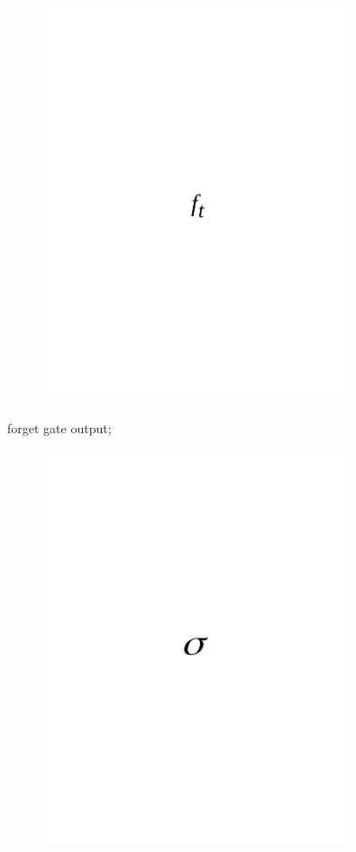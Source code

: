 \begin{figure}[H]
	\centering
	\includegraphics[width=0.8\textwidth]{media/ict/image46}
	\caption*{}
\end{figure}

forget gate output;
\begin{figure}[H]
	\centering
	\includegraphics[width=0.8\textwidth]{media/ict/image47}
	\caption*{}
\end{figure}

